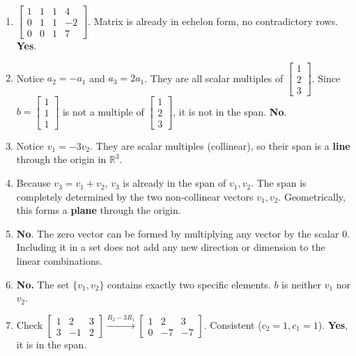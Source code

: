 \documentclass[12pt]{article}
\begin{document}
\begin{enumerate}
    \item $\begin{bmatrix} 1 & 1 & 1 & 4 \\ 0 & 1 & 1 & -2 \\ 0 & 0 & 1 & 7 \end{bmatrix}$. Matrix is already in echelon form, no contradictory rows. \textbf{Yes}.
    \item Notice $a_2 = -a_1$ and $a_3 = 2a_1$. They are all scalar multiples of $\begin{bmatrix} 1 \\ 2 \\ 3 \end{bmatrix}$. Since $b = \begin{bmatrix} 1 \\ 1 \\ 1 \end{bmatrix}$ is not a multiple of $\begin{bmatrix} 1 \\ 2 \\ 3 \end{bmatrix}$, it is not in the span. \textbf{No}.

    \item Notice $v_1 = -3v_2$. They are scalar multiples (collinear), so their span is a \textbf{line} through the origin in $\mathbb{R}^3$.
    \item Because $v_3 = v_1 + v_2$, $v_3$ is already in the span of $v_1, v_2$. The span is completely determined by the two non-collinear vectors $v_1, v_2$. Geometrically, this forms a \textbf{plane} through the origin.
    \item \textbf{No}. The zero vector can be formed by multiplying any vector by the scalar 0. Including it in a set does not add any new direction or dimension to the linear combinations.

    \item \textbf{No.} The set $\{v_1, v_2\}$ contains exactly two specific elements. $b$ is neither $v_1$ nor $v_2$.
    \item Check $\begin{bmatrix} 1 & 2 & 3 \\ 3 & -1 & 2 \end{bmatrix} \xrightarrow{R_2-3R_1} \begin{bmatrix} 1 & 2 & 3 \\ 0 & -7 & -7 \end{bmatrix}$. Consistent ($c_2=1, c_1=1$). \textbf{Yes}, it is in the span.


\end{enumerate}
\end{document}
